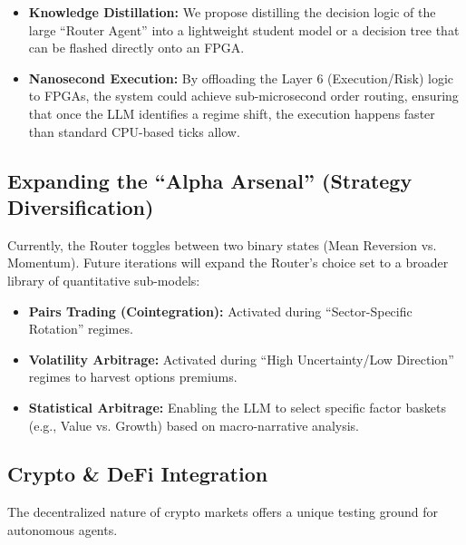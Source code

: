 \documentclass[12pt, a4paper]{report}
\begin{document}
\begin{itemize}
    \item \textbf{Knowledge Distillation:} We propose distilling the decision logic of the large ``Router Agent'' into a lightweight student model or a decision tree that can be flashed directly onto an FPGA.
    \item \textbf{Nanosecond Execution:} By offloading the Layer 6 (Execution/Risk) logic to FPGAs, the system could achieve sub-microsecond order routing, ensuring that once the LLM identifies a regime shift, the execution happens faster than standard CPU-based ticks allow.
\end{itemize}

\subsection{Expanding the ``Alpha Arsenal'' (Strategy Diversification)}
Currently, the Router toggles between two binary states (Mean Reversion vs. Momentum). Future iterations will expand the Router’s choice set to a broader library of quantitative sub-models:

\begin{itemize}
    \item \textbf{Pairs Trading (Cointegration):} Activated during ``Sector-Specific Rotation'' regimes.
    \item \textbf{Volatility Arbitrage:} Activated during ``High Uncertainty/Low Direction'' regimes to harvest options premiums.
    \item \textbf{Statistical Arbitrage:} Enabling the LLM to select specific factor baskets (e.g., Value vs. Growth) based on macro-narrative analysis.
\end{itemize}

\subsection{Crypto \& DeFi Integration}
The decentralized nature of crypto markets offers a unique testing ground for autonomous agents.
\end{document}
